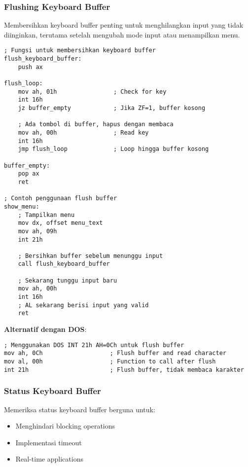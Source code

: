\documentclass[../main.tex]{subfiles}
\begin{document}
            \subsubsection{Flushing Keyboard Buffer}
Membersihkan keyboard buffer penting untuk menghilangkan input yang tidak diinginkan, terutama setelah mengubah mode input atau menampilkan menu.

\begin{lstlisting}[language={[x86masm]Assembler}, caption=Flushing Keyboard Buffer, label={lst:flush-buffer}]
; Fungsi untuk membersihkan keyboard buffer
flush_keyboard_buffer:
    push ax
    
flush_loop:
    mov ah, 01h                ; Check for key
    int 16h
    jz buffer_empty            ; Jika ZF=1, buffer kosong
    
    ; Ada tombol di buffer, hapus dengan membaca
    mov ah, 00h                ; Read key
    int 16h
    jmp flush_loop             ; Loop hingga buffer kosong
    
buffer_empty:
    pop ax
    ret

; Contoh penggunaan flush buffer
show_menu:
    ; Tampilkan menu
    mov dx, offset menu_text
    mov ah, 09h
    int 21h
    
    ; Bersihkan buffer sebelum menunggu input
    call flush_keyboard_buffer
    
    ; Sekarang tunggu input baru
    mov ah, 00h
    int 16h
    ; AL sekarang berisi input yang valid
    ret
\end{lstlisting}

\textbf{Alternatif dengan DOS}:
\begin{lstlisting}[language={[x86masm]Assembler}, caption=Flush Buffer dengan DOS INT 21h, label={lst:dos-flush}]
; Menggunakan DOS INT 21h AH=0Ch untuk flush buffer
mov ah, 0Ch                   ; Flush buffer and read character
mov al, 00h                   ; Function to call after flush
int 21h                       ; Flush buffer, tidak membaca karakter
\end{lstlisting}

            \subsubsection{Status Keyboard Buffer}
Memeriksa status keyboard buffer berguna untuk:
\begin{itemize}
    \item Menghindari blocking operations
    \item Implementasi timeout
    \item Real-time applications
\end{itemize}
\end{document}
